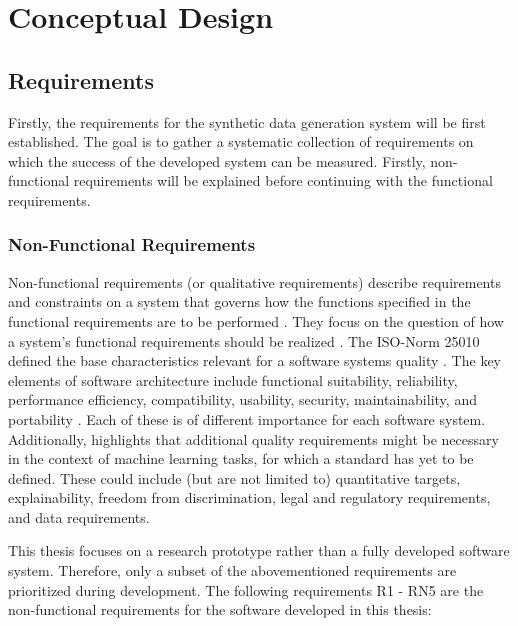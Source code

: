 \chapter{Conceptual Design}
\label{ch:conceptualDesign}

\section{Requirements}
\label{ch:requirements}

Firstly, the requirements for the synthetic data generation system will be first established.
The goal is to gather a systematic collection of requirements on which the success of the developed system can be measured.
Firstly, non-functional requirements will be explained before continuing with the functional requirements.


\subsection*{Non-Functional Requirements}

Non-functional requirements (or qualitative requirements) describe requirements and constraints on a system that governs how the functions specified in the functional requirements are to be performed \cite{broy2021EinfuehrungSoftwaretechnik}.
They focus on the question of how a system's functional requirements should be realized \cite{broy2021EinfuehrungSoftwaretechnik}.
The ISO-Norm 25010 \cite{SystemsSoftwareEngineering} defined the base characteristics relevant for a software systems quality \cite{haoues2017GuidelineSoftwareArchitecture}.
The key elements of software architecture include functional suitability, reliability, performance efficiency, compatibility, usability, security, maintainability, and portability \cite{haoues2017GuidelineSoftwareArchitecture}.
Each of these is of different importance for each software system.
Additionally, \cite{vogelsang2019RequirementsEngineeringMachine} highlights that additional quality requirements might be necessary in the context of machine learning tasks, for which a standard has yet to be defined.
These could include (but are not limited to) quantitative targets, explainability, freedom from discrimination, legal and regulatory requirements, and data requirements.

This thesis focuses on a research prototype rather than a fully developed software system.
Therefore, only a subset of the abovementioned requirements are prioritized during development.
The following requirements R1 - RN5 are the non-functional requirements for the software developed in this thesis:


